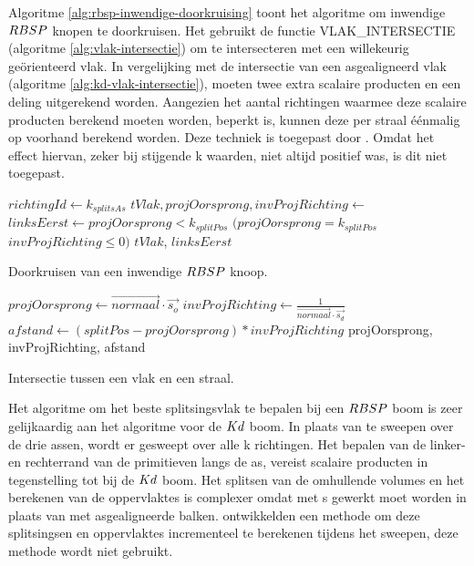 Algoritme \ref{alg:rbsp-inwendige-doorkruising} toont het algoritme om inwendige $RBSP$ knopen te doorkruisen.
Het gebruikt de functie VLAK\_INTERSECTIE (algoritme \ref{alg:vlak-intersectie}) om te intersecteren met een willekeurig geörienteerd vlak.
In vergelijking met de intersectie van een asgealigneerd vlak (algoritme \ref{alg:kd-vlak-intersectie}), moeten twee extra scalaire producten en een deling uitgerekend worden.
Aangezien het aantal richtingen waarmee deze scalaire producten berekend moeten worden, beperkt is, kunnen deze per straal éénmalig op voorhand berekend worden.
Deze techniek is toegepast door \authorBudge{} \cite{Budge}.
Omdat het effect hiervan, zeker bij stijgende k waarden, niet altijd positief was, is dit niet toegepast.\\
\begin{dutchalgorithm}
    \begin{algorithmic}       
            \State $richtingId \gets k_{splitsAs}$
            \State $tVlak, projOorsprong, invProjRichting \gets $ 
            \State $linksEerst \gets projOorsprong < k_{splitPos}$ \Or $(projOorsprong = k_{splitPos}$ \And $invProjRichting \leq 0)$
            \State \Return $tVlak$, $linksEerst$
        \EndFunction
    \end{algorithmic}
    \caption{Doorkruisen van een inwendige $RBSP$ knoop.}
    \label{alg:rbsp-inwendige-doorkruising}
\end{dutchalgorithm}

\begin{dutchalgorithm}
    \begin{algorithmic}       
            \State $projOorsprong \gets \vec{normaal} \cdot \vec{s_o}$
            \State $invProjRichting \gets \frac{1}{\vec{normaal} \cdot \vec{s_d}}$
            \State $afstand \gets (splitPos - projOorsprong) * invProjRichting $
            \State \Return projOorsprong, invProjRichting, afstand
        \EndFunction
    \end{algorithmic}
    \caption{Intersectie tussen een vlak en een straal.}
    \label{alg:vlak-intersectie}
\end{dutchalgorithm}

Het algoritme om het beste splitsingsvlak te bepalen bij een $RBSP$ boom is zeer gelijkaardig aan het algoritme voor de $Kd$ boom.
In plaats van te sweepen over de drie assen, wordt er gesweept over alle k richtingen.
Het bepalen van de linker- en rechterrand van de primitieven langs de as, vereist scalaire producten in tegenstelling tot bij de $Kd$ boom.
Het splitsen van de omhullende volumes en het berekenen van de oppervlaktes is complexer omdat met \symKDOP{}s gewerkt moet worden in plaats van met asgealigneerde balken.
\authorBudge{} \cite{Budge} ontwikkelden een methode om deze splitsingsen en oppervlaktes incrementeel te berekenen tijdens het sweepen, deze methode wordt niet gebruikt.

